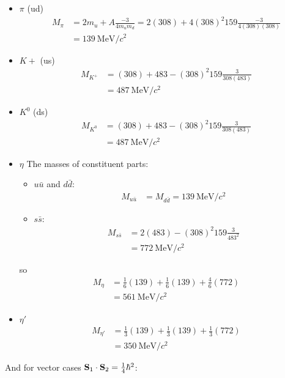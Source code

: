 \documentclass[../main.tex]{subfiles}
\begin{document}
\begin{itemize}
    \item $\pi$ (ud)
    \begin{align*}
        M_{\pi} &= 2m_u + A\frac{-3}{4m_um_d} = 2(308) + 4(308)^2 159\frac{-3}{4(308)(308)} \\
        &= \qty{139}{\MeV/c^2}
    \end{align*}
    \item $K+$ (us)
    \begin{align*}
        M_{K^+} &= (308) + 483 - (308)^2 159 \frac{3}{308(483)} \\
        &= \qty{487}{\MeV/c^2}
    \end{align*}
    \item $K^0$ (ds)
    \begin{align*}
        M_{K^0} &= (308) + 483 - (308)^2 159 \frac{3}{308(483)} \\
        &= \qty{487}{\MeV/c^2}
    \end{align*}
    \item $\eta$ The masses of constituent parts:
    \begin{itemize}
        \item $u\bar u$ and $d\bar d$:
        \begin{align*}
            M_{u\bar u} &= M_{d\bar d} = \qty{139}{\MeV/c^2}
        \end{align*}
        \item $s\bar s$:
        \begin{align*}
            M_{s\bar s} &= 2(483) - (308)^2 159 \frac{3}{483^2} \\
            &= \qty{772}{\MeV/c^2}
        \end{align*}
    \end{itemize}
    so
    \begin{align*}
        M_{\eta} &= \frac{1}{6}(139) + \frac{1}{6}(139) + \frac{4}{6}(772) \\
        &= \qty{561}{\MeV/c^2}
    \end{align*}
    \item $\eta'$ 
    \begin{align*}
        M_{\eta'} &= \frac{1}{3}(139) + \frac{1}{3}(139) + \frac{1}{3}(772) \\
        &= \qty{350}{\MeV/c^2}
    \end{align*}
\end{itemize}
And for vector cases $\vb S_1 \cdot \vb S_2 = \frac{1}{4}\hbar^2$:
\end{document}
